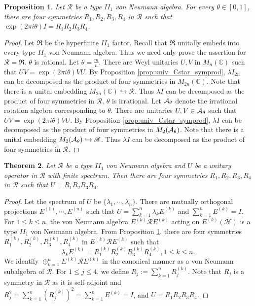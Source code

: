 \documentclass[12pt, preprint]{amsart}
\newtheorem{thm}{Theorem}[section]
\newtheorem{prop}[thm]{Proposition}
\newcommand{\fR}{\mathfrak R}     \newcommand{\sR}{\mathcal R}
\newcommand{\C}{\mathbb{C}}
\theoremstyle{definition}
\theoremstyle{remark}
\numberwithin{equation}{section}
\theoremstyle{ser}
\theoremstyle{serr}
\theoremstyle{ser}
\begin{document}
\begin{prop}
\label{prop:scalar_symprod}
\textsl{
Let $\mathscr{R}$ be a type $II_1$ von Neumann algebra. For every $\theta \in [0, 1]$, there are four symmetries $R_1, R_2, R_3, R_4$ in $\mathscr{R}$ such that $\exp(2 \pi i \theta) I = R_1 R_2 R_3 R_4$.
}
\end{prop} 
\begin{proof}
Let $\fR$ be the hyperfinite $II_1$ factor. Recall that $\fR$ unitally embeds into every type $II_1$ von Neumann algebra. Thus we need only prove the assertion for $\mathscr{R} =\fR$.
\vskip 0.1in
 $\theta$ is rational.
\vskip 0.1in
Let $\theta = \frac{m}{n}$.  There are Weyl unitaries $U, V$ in $M_n(\C)$ such that $UV = \exp(2 \pi i \theta) VU$. By Proposition \ref{prop:univ_Cstar_symprod}, $\lambda I_{2n}$ can be decomposed as the product of four symmetries in $M_{2n}(\C)$. Note that there is a unital embedding $M_{2n}(\C) \hookrightarrow \mathscr{R}$. Thus $\lambda I$ can be decomposed as the product of four symmetries in $\mathscr{R}$.
\vskip 0.1in
 $\theta$ is irrational.
\vskip 0.1in
Let $\mathcal A _{\theta}$ denote the irrational rotation algebra corresponding to $\theta$. There are unitaries $U, V \in \mathcal A _{\theta}$ such that $UV = \exp(2 \pi i \theta) VU$. By Proposition \ref{prop:univ_Cstar_symprod}, $\lambda I$ can be decomposed as the product of four symmetries in $M_2(\mathcal A _{\theta})$. Note that there is a unital embedding $M_{2}(\mathcal A_{\theta}) \hookrightarrow \mathscr{R}$. Thus $\lambda I$ can be decomposed as the product of four symmetries in $\mathscr{R}$.
\end{proof}

\begin{thm}
\label{thm:mainthm3}
{\sl Let $\mathscr{R}$ be a type $II_1$ von Neumann algebra and $U$ be a unitary operator in $\mathscr{R}$ with finite spectrum. Then there are four symmetries $R_1, R_2, R_3, R_4$ in $\mathscr{R}$ such that $U = R_1 R_2 R_3 R_4$.
}
\end{thm}
\begin{proof}
Let the spectrum of $U$ be $\{ \lambda_1, \cdots, \lambda_n \}.$ There are mutually orthogonal projections $E ^{(1)}, \cdots, E ^{(n)}$ such that $U = \sum_{k=1}^n \lambda_k E ^{(k)}$ and $\sum_{k=1}^n E ^{(k)} = I$. For $1 \le k \le n$, the von Neumann algebra $E ^{(k)} \mathscr{R} E ^{(k)}$ acting on $E ^{(k)}(\mathscr{H})$ is a type $II_1$ von Neumann algebra. From Proposition \ref{prop:scalar_symprod}, there are four symmetries $R_{1}^{(k)}, R_{2}^{(k)}, R_{3}^{(k)}, R_{4}^{(k)}$ in $E^{(k)} \mathscr{R} E^{(k)}$ such that $$\lambda_k E^{(k)} = R_{1}^{(k)} R_{2}^{(k)} R_{3}^{(k)} R_{4}^{(k)}, 1 \le k \le n.$$  We identify $\oplus_{k=1}^n E^{(k)} \mathscr{R} E^{(k)}$ in the canonical manner as a von Neumann subalgebra of $\mathscr{R}$. For $1 \le j \le 4$, we define $R_j := \sum_{k=1}^n R_{j}^{(k)}$. Note that $R_j$ is a symmetry in $\mathscr{R}$ as it is self-adjoint and $R_j^2 = \sum_{k=1}^n (R_{j}^{(k)})^2 = \sum_{k=1}^n E^{(k)} = I$, and $U = R_1 R_2 R_3 R_4.$
\end{proof}
\end{document}

